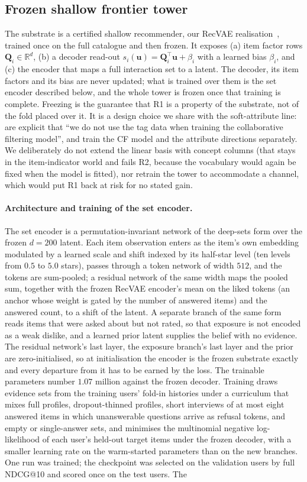 \documentclass[manuscript,screen]{acmart}
\newcommand{\R}{\mathbb{R}}
\newcommand{\Q}{\mathbf{Q}}
\newcommand{\uu}{\mathbf{u}}
\begin{document}
\subsection{Frozen shallow frontier tower}
The substrate is a certified shallow recommender, our RecVAE realisation~\citep{ren2020recvae}, trained once on the full catalogue and then frozen. It exposes (a) item factor rows $\Q_i\in\R^{d}$, (b) a decoder read-out $s_i(\uu)=\Q_i^\top\uu + \beta_i$ with a learned bias $\beta_i$, and (c) the encoder that maps a full interaction set to a latent. The decoder, its item factors and its bias are never updated; what is trained over them is the set encoder described below, and the whole tower is frozen once that training is complete. Freezing is the guarantee that R1 is a property of the substrate, not of the fold placed over it. It is a design choice we share with the soft-attribute line: \citet{gopfert2024cav} are explicit that ``we do not use the tag data when training the collaborative filtering model'', and \citet{biyik2023soft} train the CF model and the attribute directions separately. We deliberately do not extend the linear basis with concept columns (that stays in the item-indicator world and fails R2, because the vocabulary would again be fixed when the model is fitted), nor retrain the tower to accommodate a channel, which would put R1 back at risk for no stated gain. \paragraph{Architecture and training of the set encoder.} The set encoder is a permutation-invariant network of the deep-sets form over the frozen $d{=}200$ latent. Each item observation enters as the item's own embedding modulated by a learned scale and shift indexed by its half-star level (ten levels from $0.5$ to $5.0$ stars), passes through a token network of width $512$, and the tokens are sum-pooled; a residual network of the same width maps the pooled sum, together with the frozen RecVAE encoder's mean on the liked tokens (an anchor whose weight is gated by the number of answered items) and the answered count, to a shift of the latent. A separate branch of the same form reads items that were asked about but not rated, so that exposure is not encoded as a weak dislike, and a learned prior latent supplies the belief with no evidence. The residual network's last layer, the exposure branch's last layer and the prior are zero-initialised, so at initialisation the encoder is the frozen substrate exactly and every departure from it has to be earned by the loss. The trainable parameters number $1.07$ million against the frozen decoder. Training draws evidence sets from the training users' fold-in histories under a curriculum that mixes full profiles, dropout-thinned profiles, short interviews of at most eight answered items in which unanswerable questions arrive as refusal tokens, and empty or single-answer sets, and minimises the multinomial negative log-likelihood of each user's held-out target items under the frozen decoder, with a smaller learning rate on the warm-started parameters than on the new branches. One run was trained; the checkpoint was selected on the validation users by full NDCG@10 and scored once on the test users. The 
\end{document}
